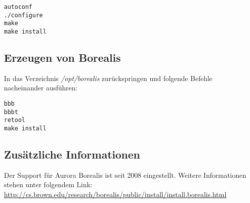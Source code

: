 \begin{verbatim}
autoconf
./configure
make
make install
\end{verbatim}


\subsection{Erzeugen von Borealis}

In das Verzeichnis \textit{/opt/borealis} zurückspringen und folgende Befehle nacheinander ausführen:

\begin{verbatim}
bbb
bbbt
retool
make install
\end{verbatim}


\subsection{Zusätzliche Informationen}
Der Support für Aurora Borealis ist seit 2008 eingestellt. Weitere Informationen stehen unter folgendem Link:
\url{http://cs.brown.edu/research/borealis/public/install/install.borealis.html}
